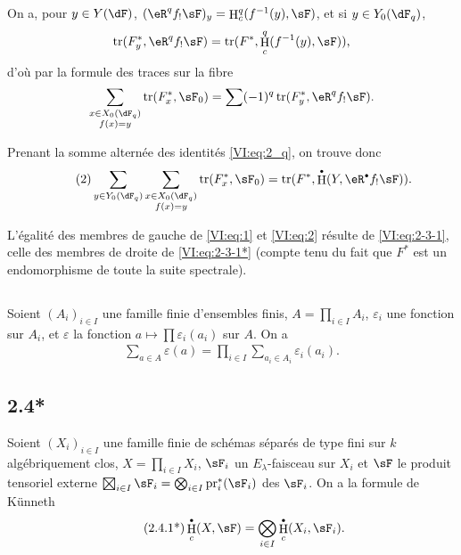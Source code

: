 \documentclass[oneside]{book}
\DeclareMathOperator{\h}{H}
\DeclareMathOperator{\tr}{tr}
\newcommand{\pr}{\mathrm{pr}} %
\theoremstyle{sga-source}
\theoremstyle{sga-source-dash}
\theoremstyle{sga-source-dotdash}
\theoremstyle{sga-source-number-note-dash}
\theoremstyle{sga-source-note-number-dotdash}
\theoremstyle{sga-source-example-dotdash}
\theoremstyle{sga-source-inline-number}
\theoremstyle{sga-source-bare-number}
\theoremstyle{sga-source}
\newcommand{\bigboxtimes}{\mathop{\vphantom{\sum}\mathchoice
  {\vcenter{\hbox{\huge $\boxtimes$}}}
  {\vcenter{\hbox{\Large $\boxtimes$}}}{\boxtimes}{\boxtimes}}\displaylimits}
\let\oldbullet\bullet
\renewcommand{\bullet}{\textnormal{\tiny$\oldbullet$}}
\newcommand{\PrintPage}[1]{}\newcommand{\MathPage}[1]{}\newcommand{\PrintCite}[2]{#1}\newcommand{\var}[3]{#1}
\begin{document}
On a, pour $y\in Y(\dF)$, $(\eR^q f_! \sF)_y = \h_c^q(f^{-1}(y),\sF)$, et si 
$y\in Y_0(\dF_q)$, 
\[
  \tr(F_y^\ast,\eR^q f_! \sF) = \tr(F^\ast,\h_c^q(f^{-1}(y),\sF)) \text{,}
\]
d'où par la formule des traces sur la fibre 
\[
  \sum_{\substack{x\in X_0(\dF_q) \\ f(x) = y}} \tr(F_x^\ast,\sF_0) = \sum (-1)^q \tr(F_y^\ast,\eR^q f_! \sF) \text{.}
\]
\PrintPage{185}
Prenant la somme alternée des identités \eqref{VI:eq:2_q}, on trouve donc 
\begin{align*}\tag{2}\label{VI:eq:2}
  \sum_{y\in Y_0(\dF_q)} \sum_{\substack{x \in X_0(\dF_q) \\ f(x) = y}} \tr(F_x^\ast,\sF_0) = \var{\tr(F^\ast,\h^\bullet(Y,\eR^\bullet f_! \sF))}{\tr(F^\ast,\h_c^\bullet(Y,\eR^\bullet f_! \sF))}{S45-SOL-0738} \text{.}
\end{align*}

L'égalité des membres de gauche de \eqref{VI:eq:1} et \eqref{VI:eq:2} 
résulte de \eqref{VI:eq:2-3-1}, celle des membres de droite de 
\eqref{VI:eq:2-3-1*} (compte tenu du fait que $F^\ast$ est un endomorphisme de 
toute la suite spectrale). 





\subsection{}\label{VI:2-4}

Soient $(A_i)_{i\in I}$ une famille finie d'ensembles finis, 
$A=\prod_{i\in I} A_i$, $\varepsilon_i$ une fonction sur $A_i$, et 
$\varepsilon$ la fonction $a\mapsto \prod \varepsilon_i(a_i)$ sur $A$. On a 
\begin{align*}\tag{2.4.1}\label{VI:eq:2-4-1}
  \sum_{a\in A} \varepsilon(a) = \prod_{i\in I} \sum_{a_i\in A_i} \varepsilon_i(a_i) \text{.}
\end{align*}





\subsection*{2.4*}\label{VI:2-4*}

Soient $(X_i)_{i\in I}$ une famille finie de schémas séparés de type fini 
sur $k$ algébriquement clos, $X=\prod_{i\in I} X_i$, $\sF_i$ un 
$E_\lambda$-faisceau sur $X_i$ et $\sF$ le produit tensoriel externe 
$\bigboxtimes_{i\in I}\sF_i = \bigotimes_{i\in I} \pr_i^\ast(\sF_i)$ 
des $\sF_i$. On a la formule de K\"unneth 
\begin{align*}\tag{2.4.1*}\label{VI:eq:2-4-1*}
  \h_c^\bullet(X,\sF) = \bigotimes_{i\in I} \h_c^\bullet(X_i,\sF_i) \text{.}
\end{align*}
\end{document}
